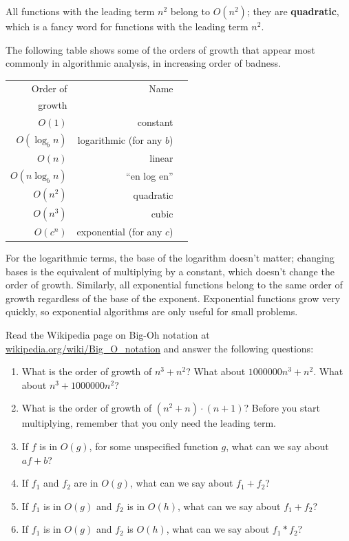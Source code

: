 \documentclass[10pt]{book}
\begin{document}
All functions with the leading term $n^2$ belong to $O(n^2)$; they are
{\bf quadratic}, which is a fancy word for functions with the
leading term $n^2$.

The following table shows some of the orders of growth that
appear most commonly in algorithmic analysis,
in increasing order of badness.

\begin{tabular}{|r|r|r|}
\hline
Order of     &   Name      \\
growth       &               \\
\hline
$O(1)$             & constant \\
$O(\log_b n)$      & logarithmic (for any $b$) \\
$O(n)$             & linear \\
$O(n \log_b n)$    & ``en log en'' \\
$O(n^2)$           & quadratic     \\
$O(n^3)$           & cubic     \\
$O(c^n)$           & exponential (for any $c$)    \\
\hline
\end{tabular}

For the logarithmic terms, the base of the logarithm doesn't matter;
changing bases is the equivalent of multiplying by a constant, which
doesn't change the order of growth.  Similarly, all exponential
functions belong to the same order of growth regardless of the base of
the exponent.
Exponential functions grow very quickly, so exponential algorithms are
only useful for small problems.


\begin{ex}

Read the Wikipedia page on Big-Oh notation at
\url{wikipedia.org/wiki/Big_O_notation} and
answer the following questions:

\begin{enumerate}

\item What is the order of growth of $n^3 + n^2$?
What about $1000000 n^3 + n^2$.
What about $n^3 + 1000000 n^2$?  

\item What is the order of growth of $(n^2 + n) \cdot (n + 1)$?  Before
  you start multiplying, remember that you only need the leading term.

\item If $f$ is in $O(g)$, for some unspecified function $g$, what can
  we say about $a f + b$?

\item If $f_1$ and $f_2$ are in $O(g)$, what can we say about $f_1 + f_2$?

\item If  $f_1$ is in $O(g)$
and $f_2$ is in $O(h)$,
what can we say about  $f_1 + f_2$?

\item If  $f_1$ is in $O(g)$ and $f_2$ is $O(h)$,
what can we say about  $f_1 * f_2$?

\end{enumerate}

\end{ex}
\end{document}
